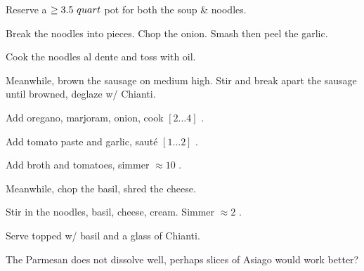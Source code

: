 \begin{preparation}
\item Reserve a $\geq 3.5~quart$ pot for both the soup \& noodles.

\item Break the noodles into pieces.
    Chop the onion.
    Smash then peel the garlic.

\item Cook the noodles al dente and toss with oil.

\item Meanwhile, brown the sausage on medium high.
    Stir and break apart the sausage until browned, deglaze w/ Chianti.

\item Add oregano, marjoram, onion, cook $[2 \ldots 4]$ \minute.

\item Add tomato paste and garlic, saut\'{e} $[1 \ldots 2]$ \minute.

\item Add broth and tomatoes, simmer $\approx 10$ \minute.

\item Meanwhile, chop the basil, shred the cheese.

\item Stir in the noodles, basil, cheese, cream.
    Simmer $\approx 2$ \minute.

\item Serve topped w/ basil and a glass of Chianti.
\end{preparation}

\begin{experiments}
\item The Parmesan does not dissolve well, perhaps slices of Asiago would work better?
\end{experiments}

\recipeend%
